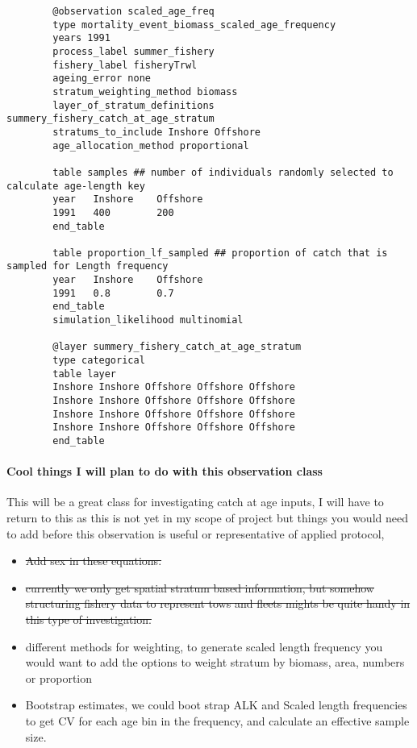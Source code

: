 {\small{\begin{verbatim}
		@observation scaled_age_freq
		type mortality_event_biomass_scaled_age_frequency
		years 1991
		process_label summer_fishery
		fishery_label fisheryTrwl
		ageing_error none
		stratum_weighting_method biomass
		layer_of_stratum_definitions summery_fishery_catch_at_age_stratum
		stratums_to_include Inshore Offshore
		age_allocation_method proportional
		
		table samples ## number of individuals randomly selected to calculate age-length key
		year   Inshore    Offshore
		1991   400        200
		end_table
		
		table proportion_lf_sampled ## proportion of catch that is sampled for Length frequency
		year   Inshore    Offshore
		1991   0.8        0.7
		end_table
		simulation_likelihood multinomial
		
		@layer summery_fishery_catch_at_age_stratum
		type categorical
		table layer 
		Inshore Inshore Offshore Offshore Offshore
		Inshore Inshore Offshore Offshore Offshore
		Inshore Inshore Offshore Offshore Offshore
		Inshore Inshore Offshore Offshore Offshore
		end_table
		\end{verbatim}}}


\paragraph*{Cool things I will plan to do with this observation class}
This will be a great class for investigating catch at age inputs, I will have to return to this as this is not yet in my scope of project but things you would need to add before this observation is useful or representative of applied protocol,

\begin{itemize}
	\item \sout{Add sex in these equations.}
	\item \sout{currently we only get spatial stratum based information, but somehow structuring fishery data to represent tows and fleets mights be quite handy in this type of investigation.}
	\item different methods for weighting, to generate scaled length frequency you would want to add the options to weight stratum by biomass, area, numbers or proportion
	\item Bootstrap estimates, we could boot strap ALK and Scaled length frequencies to get CV for each age bin in the frequency, and calculate an effective sample size.
\end{itemize}



